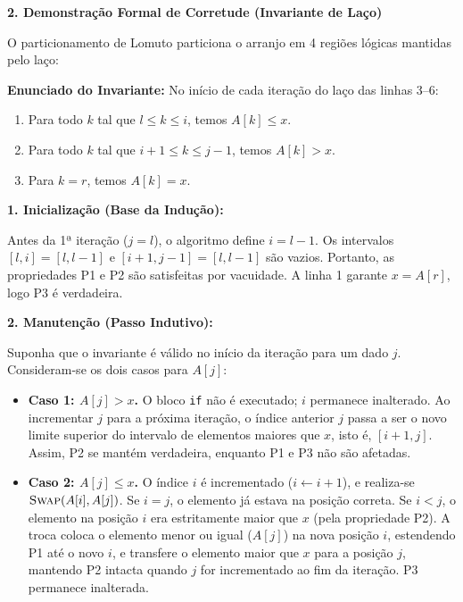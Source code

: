 \documentclass[11pt,a4paper]{article}
\newcommand{\topico}[1]{\par\medskip\textbf{\color{azul}#1}\par}
\newcommand{\subtopico}[1]{\par\smallskip\textbf{#1}\par}
\begin{document}
\topico{2. Demonstração Formal de Corretude (Invariante de Laço)}
O particionamento de Lomuto particiona o arranjo em 4 regiões lógicas mantidas pelo laço:
\begin{center}
\end{center}

\textbf{Enunciado do Invariante:} No início de cada iteração do laço das linhas 3--6:
\begin{enumerate}
  \item[P1.] Para todo $k$ tal que $l \le k \le i$, temos $A[k] \le x$.
  \item[P2.] Para todo $k$ tal que $i+1 \le k \le j-1$, temos $A[k] > x$.
  \item[P3.] Para $k = r$, temos $A[k] = x$.
\end{enumerate}

\subtopico{1. Inicialização (Base da Indução):}
Antes da 1ª iteração ($j = l$), o algoritmo define $i = l - 1$.
Os intervalos $[l, i] = [l, l-1]$ e $[i+1, j-1] = [l, l-1]$ são vazios. Portanto, as propriedades P1 e P2 são satisfeitas por vacuidade. A linha 1 garante $x = A[r]$, logo P3 é verdadeira.

\subtopico{2. Manutenção (Passo Indutivo):}
Suponha que o invariante é válido no início da iteração para um dado $j$. Consideram-se os dois casos para $A[j]$:
\begin{itemize}
  \item \textbf{Caso 1: $A[j] > x$.} O bloco \texttt{if} não é executado; $i$ permanece inalterado. Ao incrementar $j$ para a próxima iteração, o índice anterior $j$ passa a ser o novo limite superior do intervalo de elementos maiores que $x$, isto é, $[i+1, j]$. Assim, P2 se mantém verdadeira, enquanto P1 e P3 não são afetadas.
  \item \textbf{Caso 2: $A[j] \le x$.} O índice $i$ é incrementado ($i \leftarrow i + 1$), e realiza-se $\textsc{Swap}(A[i], A[j])$.
    Se $i = j$, o elemento já estava na posição correta. Se $i < j$, o elemento na posição $i$ era estritamente maior que $x$ (pela propriedade P2). A troca coloca o elemento menor ou igual ($A[j]$) na nova posição $i$, estendendo P1 até o novo $i$, e transfere o elemento maior que $x$ para a posição $j$, mantendo P2 intacta quando $j$ for incrementado ao fim da iteração. P3 permanece inalterada.
\end{itemize}
\end{document}
